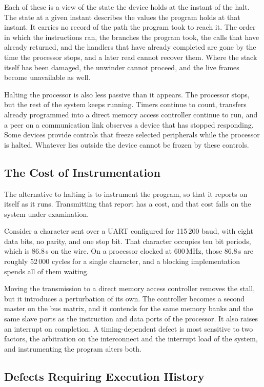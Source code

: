 Each of these is a view of the state the device holds at the instant of the halt. The state at a given instant describes the values the program holds at that instant. It carries no record of the path the program took to reach it. The order in which the instructions ran, the branches the program took, the calls that have already returned, and the handlers that have already completed are gone by the time the processor stops, and a later read cannot recover them. Where the stack itself has been damaged, the unwinder cannot proceed, and the live frames become unavailable as well.

Halting the processor is also less passive than it appears. The processor stops, but the rest of the system keeps running. Timers continue to count, transfers already programmed into a direct memory access controller continue to run, and a peer on a communication link observes a device that has stopped responding. Some devices provide controls that freeze selected peripherals while the processor is halted. Whatever lies outside the device cannot be frozen by these controls.

\subsection{The Cost of Instrumentation}

The alternative to halting is to instrument the program, so that it reports on itself as it runs. Transmitting that report has a cost, and that cost falls on the system under examination.

Consider a character sent over a UART configured for 115\,200 baud, with eight data bits, no parity, and one stop bit. That character occupies ten bit periods, which is 86.8\,\textmu s on the wire. On a processor clocked at 600\,MHz, those 86.8\,\textmu s are roughly 52\,000 cycles for a single character, and a blocking implementation spends all of them waiting.

Moving the transmission to a direct memory access controller removes the stall, but it introduces a perturbation of its own. The controller becomes a second master on the bus matrix, and it contends for the same memory banks and the same slave ports as the instruction and data ports of the processor. It also raises an interrupt on completion. A timing-dependent defect is most sensitive to two factors, the arbitration on the interconnect and the interrupt load of the system, and instrumenting the program alters both.

\subsection{Defects Requiring Execution History}

